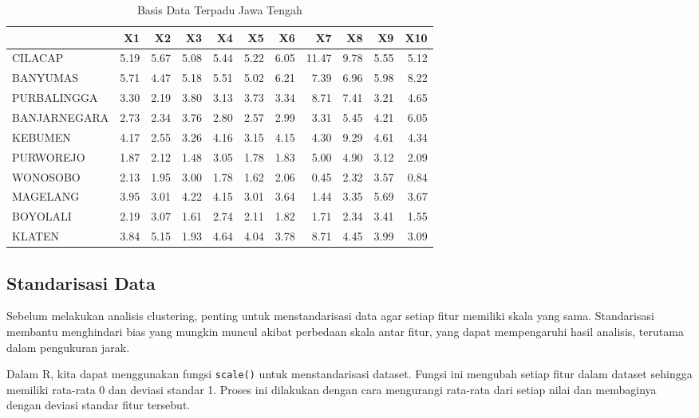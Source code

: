 \documentclass[
  oneside]{book}
\begin{document}
\begin{table}

\caption{\label{tab:nice-tab-2}Basis Data Terpadu Jawa Tengah}
\centering
\begin{tabular}[t]{lrrrrrrrrrr}
\toprule
  & X1 & X2 & X3 & X4 & X5 & X6 & X7 & X8 & X9 & X10\\
\midrule
CILACAP & 5.19 & 5.67 & 5.08 & 5.44 & 5.22 & 6.05 & 11.47 & 9.78 & 5.55 & 5.12\\
BANYUMAS & 5.71 & 4.47 & 5.18 & 5.51 & 5.02 & 6.21 & 7.39 & 6.96 & 5.98 & 8.22\\
PURBALINGGA & 3.30 & 2.19 & 3.80 & 3.13 & 3.73 & 3.34 & 8.71 & 7.41 & 3.21 & 4.65\\
BANJARNEGARA & 2.73 & 2.34 & 3.76 & 2.80 & 2.57 & 2.99 & 3.31 & 5.45 & 4.21 & 6.05\\
KEBUMEN & 4.17 & 2.55 & 3.26 & 4.16 & 3.15 & 4.15 & 4.30 & 9.29 & 4.61 & 4.34\\
\addlinespace
PURWOREJO & 1.87 & 2.12 & 1.48 & 3.05 & 1.78 & 1.83 & 5.00 & 4.90 & 3.12 & 2.09\\
WONOSOBO & 2.13 & 1.95 & 3.00 & 1.78 & 1.62 & 2.06 & 0.45 & 2.32 & 3.57 & 0.84\\
MAGELANG & 3.95 & 3.01 & 4.22 & 4.15 & 3.01 & 3.64 & 1.44 & 3.35 & 5.69 & 3.67\\
BOYOLALI & 2.19 & 3.07 & 1.61 & 2.74 & 2.11 & 1.82 & 1.71 & 2.34 & 3.41 & 1.55\\
KLATEN & 3.84 & 5.15 & 1.93 & 4.64 & 4.04 & 3.78 & 8.71 & 4.45 & 3.99 & 3.09\\
\bottomrule
\end{tabular}
\end{table}

\subsection*{Standarisasi Data}\label{standarisasi-data}

Sebelum melakukan analisis clustering, penting untuk menstandarisasi data agar setiap fitur memiliki skala yang sama. Standarisasi membantu menghindari bias yang mungkin muncul akibat perbedaan skala antar fitur, yang dapat mempengaruhi hasil analisis, terutama dalam pengukuran jarak.

Dalam R, kita dapat menggunakan fungsi \texttt{scale()} untuk menstandarisasi dataset. Fungsi ini mengubah setiap fitur dalam dataset sehingga memiliki rata-rata 0 dan deviasi standar 1. Proses ini dilakukan dengan cara mengurangi rata-rata dari setiap nilai dan membaginya dengan deviasi standar fitur tersebut.
\end{document}
